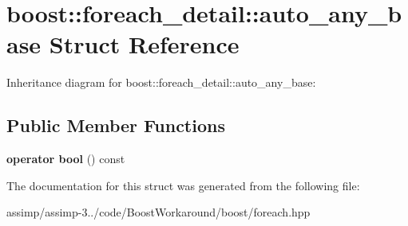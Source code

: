 \hypertarget{structboost_1_1foreach__detail_1_1auto__any__base}{\section{boost\+:\+:foreach\+\_\+detail\+:\+:auto\+\_\+any\+\_\+base Struct Reference}
\label{structboost_1_1foreach__detail_1_1auto__any__base}
}


Inheritance diagram for boost\+:\+:foreach\+\_\+detail\+:\+:auto\+\_\+any\+\_\+base\+:
\subsection*{Public Member Functions}
\begin{DoxyCompactItemize}
\item 
\hypertarget{structboost_1_1foreach__detail_1_1auto__any__base_a59b9aec27f7aad61c3bedea4b5a479b4}{{\bfseries operator bool} () const }\label{structboost_1_1foreach__detail_1_1auto__any__base_a59b9aec27f7aad61c3bedea4b5a479b4}

\end{DoxyCompactItemize}


The documentation for this struct was generated from the following file\+:\begin{DoxyCompactItemize}
\item 
assimp/assimp-\/3../code/\+Boost\+Workaround/boost/foreach.\+hpp\end{DoxyCompactItemize}
